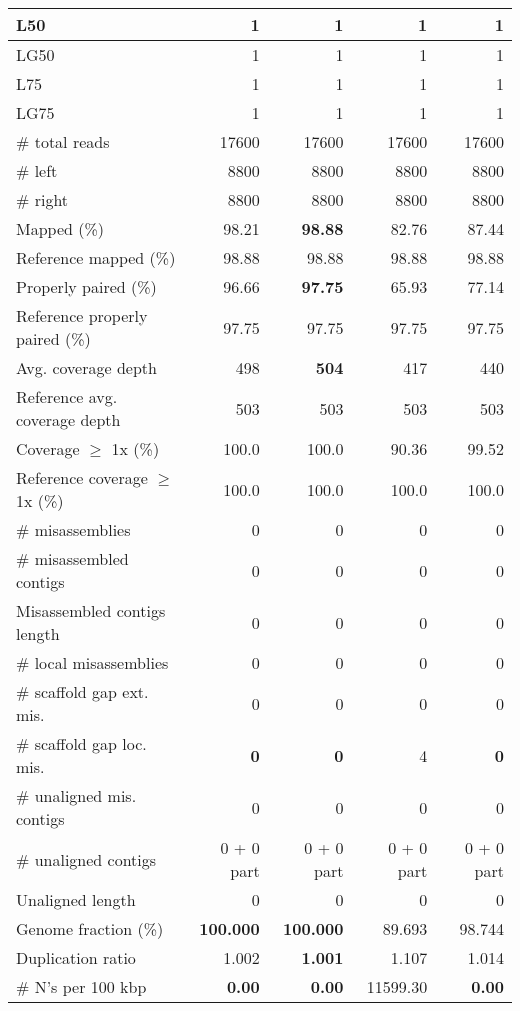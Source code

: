 \documentclass[12pt,a4paper]{article}
\begin{document}
\begin{table}[ht]
\begin{center}
\begin{tabular}{|l*{4}{|r}|}
L50 & 1 & 1 & 1 & 1 \\ \hline
LG50 & 1 & 1 & 1 & 1 \\ \hline
L75 & 1 & 1 & 1 & 1 \\ \hline
LG75 & 1 & 1 & 1 & 1 \\ \hline
\# total reads & 17600 & 17600 & 17600 & 17600 \\ \hline
\# left & 8800 & 8800 & 8800 & 8800 \\ \hline
\# right & 8800 & 8800 & 8800 & 8800 \\ \hline
Mapped (\%) & 98.21 & {\bf 98.88} & 82.76 & 87.44 \\ \hline
Reference mapped (\%) & 98.88 & 98.88 & 98.88 & 98.88 \\ \hline
Properly paired (\%) & 96.66 & {\bf 97.75} & 65.93 & 77.14 \\ \hline
Reference properly paired (\%) & 97.75 & 97.75 & 97.75 & 97.75 \\ \hline
Avg. coverage depth & 498 & {\bf 504} & 417 & 440 \\ \hline
Reference avg. coverage depth & 503 & 503 & 503 & 503 \\ \hline
Coverage $\geq$ 1x (\%) & 100.0 & 100.0 & 90.36 & 99.52 \\ \hline
Reference coverage $\geq$ 1x (\%) & 100.0 & 100.0 & 100.0 & 100.0 \\ \hline
\# misassemblies & 0 & 0 & 0 & 0 \\ \hline
\# misassembled contigs & 0 & 0 & 0 & 0 \\ \hline
Misassembled contigs length & 0 & 0 & 0 & 0 \\ \hline
\# local misassemblies & 0 & 0 & 0 & 0 \\ \hline
\# scaffold gap ext. mis. & 0 & 0 & 0 & 0 \\ \hline
\# scaffold gap loc. mis. & {\bf 0} & {\bf 0} & 4 & {\bf 0} \\ \hline
\# unaligned mis. contigs & 0 & 0 & 0 & 0 \\ \hline
\# unaligned contigs & 0 + 0 part & 0 + 0 part & 0 + 0 part & 0 + 0 part \\ \hline
Unaligned length & 0 & 0 & 0 & 0 \\ \hline
Genome fraction (\%) & {\bf 100.000} & {\bf 100.000} & 89.693 & 98.744 \\ \hline
Duplication ratio & 1.002 & {\bf 1.001} & 1.107 & 1.014 \\ \hline
\# N's per 100 kbp & {\bf 0.00} & {\bf 0.00} & 11599.30 & {\bf 0.00} \\ \hline

\end{tabular}
\end{center}
\end{table}
\end{document}
